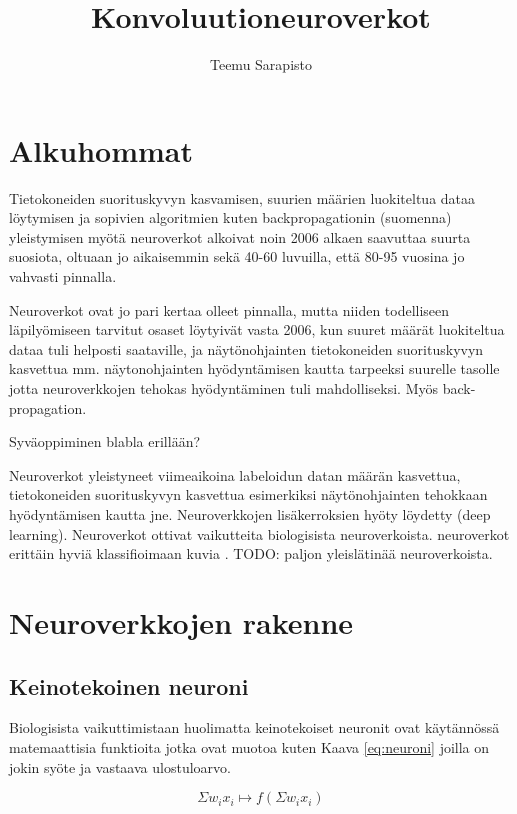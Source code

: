 \documentclass[11pt]{article}
\theoremstyle{plain}
\theoremstyle{definition}
\begin{document}
  \title{Konvoluutioneuroverkot}
  \author{Teemu Sarapisto}
  \maketitle

  \section{Alkuhommat}

  Tietokoneiden suorituskyvyn kasvamisen, suurien määrien luokiteltua dataa löytymisen ja sopivien algoritmien kuten backpropagationin  (suomenna) yleistymisen myötä neuroverkot alkoivat noin 2006 alkaen saavuttaa suurta suosiota, oltuaan jo aikaisemmin sekä 40-60 luvuilla, että 80-95 vuosina jo vahvasti pinnalla.

  Neuroverkot ovat jo pari kertaa olleet pinnalla, mutta niiden todelliseen läpilyömiseen tarvitut osaset löytyivät vasta 2006, kun suuret määrät luokiteltua dataa tuli helposti saataville, ja näytönohjainten tietokoneiden suorituskyvyn kasvettua mm. näytonohjainten hyödyntämisen kautta tarpeeksi suurelle tasolle jotta neuroverkkojen tehokas hyödyntäminen tuli mahdolliseksi. Myös back-propagation.

  Syväoppiminen blabla erillään?


  
  Neuroverkot yleistyneet viimeaikoina labeloidun datan määrän kasvettua, tietokoneiden suorituskyvyn kasvettua esimerkiksi näytönohjainten tehokkaan hyödyntämisen kautta jne. Neuroverkkojen lisäkerroksien hyöty löydetty (deep learning). Neuroverkot ottivat vaikutteita biologisista neuroverkoista. neuroverkot erittäin hyviä klassifioimaan kuvia \cite{Goodfellow-et-al-2016}. TODO: paljon yleislätinää neuroverkoista.


  \section{Neuroverkkojen rakenne}
  \subsection{Keinotekoinen neuroni}


    Biologisista vaikuttimistaan huolimatta keinotekoiset neuronit ovat käytännössä matemaattisia funktioita jotka ovat muotoa kuten Kaava \ref{eq:neuroni} joilla on jokin syöte ja vastaava ulostuloarvo. 

    \begin{equation}
      \label{eq:neuroni}
      \Sigma w_i x_i \mapsto f(\Sigma w_i x_i)
    \end{equation}
    
\end{document}
